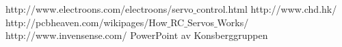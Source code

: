 \begin{thebibliography}{9}

 \label{ref:PWM} http://www.electroons.com/electroons/servo$\_$control.html
 \label{ref:PowerHD} http://www.chd.hk/
 \label{ref:SerCtrl} http://pcbheaven.com/wikipages/How$\_$RC$\_$Servos$\_$Works/
 \label{ref:InSens} http://www.invensense.com/
 \label{ref:PowerPoint} PowerPoint av Konsberggruppen

\end{thebibliography}
